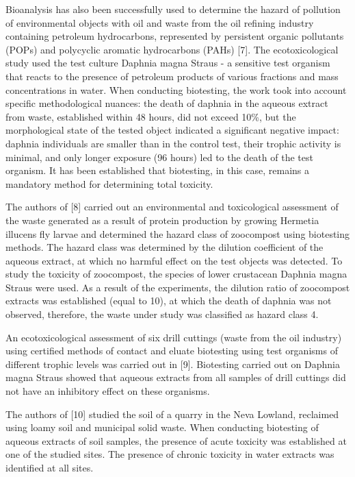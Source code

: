 \begin{multicols}{2}
Bioanalysis has also been successfully used to determine the hazard of
pollution of environmental objects with oil and waste from the oil
refining industry containing petroleum hydrocarbons, represented by
persistent organic pollutants (POPs) and polycyclic aromatic
hydrocarbons (PAHs) {[}7{]}. The ecotoxicological study used the test
culture Daphnia magna Straus - a sensitive test organism that reacts to
the presence of petroleum products of various fractions and mass
concentrations in water. When conducting biotesting, the work took into
account specific methodological nuances: the death of daphnia in the
aqueous extract from waste, established within 48 hours, did not exceed
10\%, but the morphological state of the tested object indicated a
significant negative impact: daphnia individuals are smaller than in the
control test, their trophic activity is minimal, and only longer
exposure (96 hours) led to the death of the test organism. It has been
established that biotesting, in this case, remains a mandatory method
for determining total toxicity.

The authors of {[}8{]} carried out an environmental and toxicological
assessment of the waste generated as a result of protein production by
growing Hermetia illucens fly larvae and determined the hazard class of
zoocompost using biotesting methods. The hazard class was determined by
the dilution coefficient of the aqueous extract, at which no harmful
effect on the test objects was detected. To study the toxicity of
zoocompost, the species of lower crustacean Daphnia magna Straus were
used. As a result of the experiments, the dilution ratio of zoocompost
extracts was established (equal to 10), at which the death of daphnia
was not observed, therefore, the waste under study was classified as
hazard class 4.

An ecotoxicological assessment of six drill cuttings (waste from the oil
industry) using certified methods of contact and eluate biotesting using
test organisms of different trophic levels was carried out in {[}9{]}.
Biotesting carried out on Daphnia magna Straus showed that aqueous
extracts from all samples of drill cuttings did not have an inhibitory
effect on these organisms.

The authors of {[}10{]} studied the soil of a quarry in the Neva
Lowland, reclaimed using loamy soil and municipal solid waste. When
conducting biotesting of aqueous extracts of soil samples, the presence
of acute toxicity was established at one of the studied sites. The
presence of chronic toxicity in water extracts was identified at all
sites.


\end{multicols}
